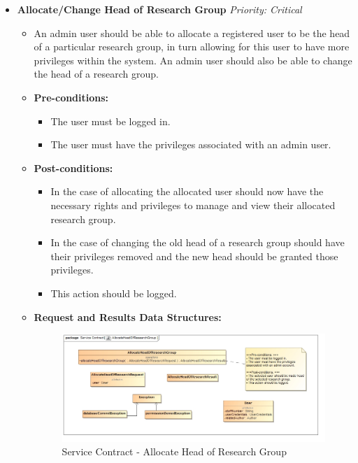 \documentclass{article}
\begin{document}
\begin{itemize}
					\cleardoublepage
					\item \textbf{Allocate/Change Head of Research Group} \hfill \textit{Priority: Critical}
					\begin{itemize}
						\item An admin user should be able to allocate a registered user to be the head of a particular research group, in turn allowing for this user to have more privileges within the system. An admin user should also be able to change the head of a research group.
						\item \textbf{Pre-conditions:}
						\begin{itemize}
							\item The user must be logged in.
							\item The user must have the privileges associated with an admin user.
						\end{itemize}
						\item \textbf{Post-conditions:}
						\begin{itemize}
							\item In the case of allocating the allocated user should now have the necessary rights and privileges to manage and view their allocated research group.
							\item In the case of changing the old head of a research group should have their privileges removed and the new head should be granted those privileges.
							\item This action should be logged.
						\end{itemize}
						\item \textbf{Request and Results Data Structures:}
						\begin{figure}[H]
							\includegraphics[width=\linewidth]{../Diagrams/ServiceContracts/Group control subsystem/AllocateHeadOfResearchGroup.jpg}
							\caption{Service Contract - Allocate Head of Research Group}
						\end{figure}
					\end{itemize}
				\end{itemize}
				
\end{document}
